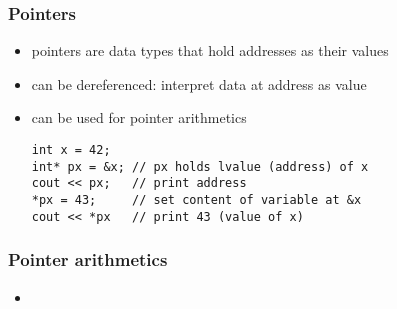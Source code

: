 \begin{frame}[fragile]
    \frametitle{Pointers}
    \begin{itemize}
        \item pointers are data types that hold addresses as their values
        \item can be dereferenced: interpret data at address as value
        \item can be used for pointer arithmetics
        \begin{lstlisting}
int x = 42;
int* px = &x; // px holds lvalue (address) of x
cout << px;   // print address
*px = 43;     // set content of variable at &x
cout << *px   // print 43 (value of x)
        \end{lstlisting}
    \end{itemize}
\end{frame}

\begin{frame}[fragile]
    \frametitle{Pointer arithmetics}
    \begin{itemize}
        \item
    \end{itemize}
\end{frame}


